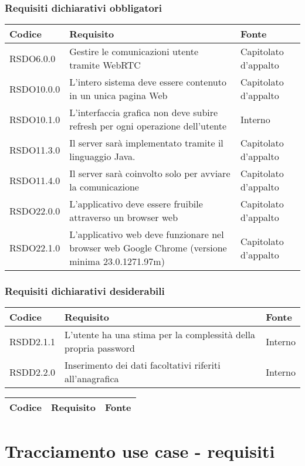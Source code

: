 \subsubsection{Requisiti dichiarativi obbligatori}

\begin{center}
\begin{longtable}{lp{}l}
\toprule Codice & Requisito & Fonte\\
\midrule
RSDO6.0.0 & Gestire le comunicazioni utente tramite WebRTC & Capitolato d'appalto \\
RSDO10.0.0 & L'intero sistema deve essere contenuto in un unica pagina Web & Capitolato d'appalto \\
RSDO10.1.0 & L'interfaccia grafica non deve subire refresh per ogni operazione dell'utente & Interno \\
RSDO11.3.0 & Il server sarà implementato tramite il linguaggio Java. & Capitolato d'appalto \\
RSDO11.4.0 & Il server sarà coinvolto solo per avviare la comunicazione & Capitolato d'appalto \\
RSDO22.0.0 & L'applicativo deve essere fruibile attraverso un browser web & Capitolato d'appalto \\
RSDO22.1.0 & L'applicativo web deve funzionare nel browser web Google Chrome (versione minima 23.0.1271.97m) & Capitolato d'appalto \\
\bottomrule
\end{longtable}
\end{center}

\subsubsection{Requisiti dichiarativi desiderabili}

\begin{center}
\begin{longtable}{lp{}l}
\toprule Codice & Requisito & Fonte\\
\midrule
RSDD2.1.1 & L'utente ha una stima per la complessità della propria password & Interno \\
RSDD2.2.0 & Inserimento dei dati facoltativi riferiti all'anagrafica & Interno \\
\bottomrule
\end{longtable}
\end{center}

\begin{center}
\begin{longtable}{lp{}l}
\toprule Codice & Requisito & Fonte\\
\midrule
\bottomrule
\end{longtable}
\end{center}
\newpage\section{Tracciamento use case - requisiti}\label{sec:tracciamento}

